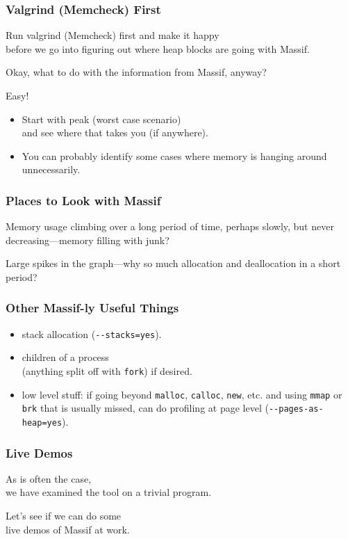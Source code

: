 \begin{frame}
\frametitle{Valgrind (Memcheck) First}


Run valgrind (Memcheck) first and make it happy \\
before we go into figuring out where heap blocks are going with Massif. 

Okay, what to do with the information from Massif, anyway? 

Easy!
\begin{itemize}
\item Start with peak (worst case scenario) \\ and see where that takes you (if anywhere). 

\item You can probably identify some cases where memory is hanging around unnecessarily. 
\end{itemize}



\end{frame}


\begin{frame}
\frametitle{Places to Look with Massif}

\large
Memory usage climbing over a long period of time, perhaps slowly, but never decreasing---memory filling with junk? 

Large spikes in the graph---why so much allocation and deallocation in a short period?
\end{frame}



\begin{frame}[fragile]
\frametitle{Other Massif-ly Useful Things}

\large
\begin{itemize}
	\item stack allocation (\verb+--stacks=yes+).
	\item children of a process \\ (anything split off with \texttt{fork}) if desired.
	\item low level stuff: if going beyond \texttt{malloc}, \texttt{calloc}, \texttt{new}, etc. and using \texttt{mmap} or \texttt{brk} that is usually missed, can do profiling at page level (\verb+--pages-as-heap=yes+).
\end{itemize}

\end{frame}




\begin{frame}
\frametitle{Live Demos}

\large

As is often the case, \\ we have examined the tool on a trivial program. 

Let's see if we can do some\\
 live demos of Massif at work.

\end{frame}


